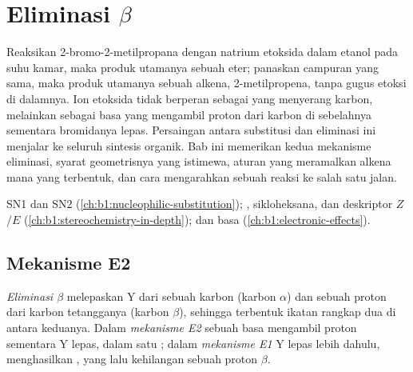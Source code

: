 \chapter{Eliminasi \texorpdfstring{$\beta$}{Beta}}\label{ch:b1:elimination}

Reaksikan 2-bromo-2-metilpropana dengan natrium etoksida dalam etanol
pada suhu kamar, maka produk utamanya sebuah eter; panaskan campuran yang
sama, maka produk utamanya sebuah alkena, 2-metilpropena, tanpa gugus
etoksi di dalamnya. Ion etoksida tidak berperan sebagai  yang
menyerang karbon, melainkan sebagai basa yang mengambil proton dari
karbon di sebelahnya sementara bromidanya lepas. Persaingan antara
substitusi dan eliminasi ini menjalar ke seluruh sintesis organik. Bab
ini memerikan kedua mekanisme eliminasi, syarat geometrisnya yang
istimewa, aturan yang meramalkan alkena mana yang terbentuk, dan cara
mengarahkan sebuah reaksi ke salah satu jalan.

\begin{recall}
SN1 dan SN2 (\cref{ch:b1:nucleophilic-substitution}); ,
 sikloheksana, dan deskriptor $Z$/$E$
(\cref{ch:b1:stereochemistry-in-depth});  dan basa
(\cref{ch:b1:electronic-effects}).
\end{recall}

\section{Mekanisme E2}

\begin{definition}\label{def:b1:elimination:elimination}
\emph{Eliminasi $\beta$} melepaskan  Y
dari sebuah karbon (karbon $\alpha$) dan sebuah proton dari karbon
tetangganya (karbon $\beta$), sehingga terbentuk ikatan rangkap dua di
antara keduanya. Dalam \emph{mekanisme E2} sebuah basa
mengambil proton sementara Y lepas, dalam satu ; dalam
\emph{mekanisme E1} Y lepas lebih dahulu,
menghasilkan , yang lalu kehilangan sebuah proton $\beta$.
\end{definition}

